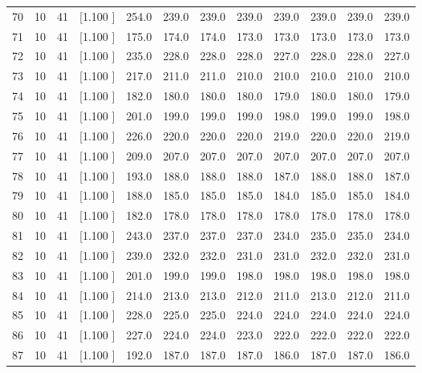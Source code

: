 \documentclass[12pt,a4paper]{article}
\begin{document}
\begin{center}
{\begin{tabular}{r r r r r r r r r r r r}
  70& 10& 41&[1.100     ]&   254.0&   239.0&   239.0&   239.0&   239.0&   239.0&   239.0&   239.0\\[-0.02in]
  71& 10& 41&[1.100     ]&   175.0&   174.0&   174.0&   173.0&   173.0&   173.0&   173.0&   173.0\\[-0.02in]
  72& 10& 41&[1.100     ]&   235.0&   228.0&   228.0&   228.0&   227.0&   228.0&   228.0&   227.0\\[-0.02in]
  73& 10& 41&[1.100     ]&   217.0&   211.0&   211.0&   210.0&   210.0&   210.0&   210.0&   210.0\\[-0.02in]
  74& 10& 41&[1.100     ]&   182.0&   180.0&   180.0&   180.0&   179.0&   180.0&   180.0&   179.0\\[-0.02in]
  75& 10& 41&[1.100     ]&   201.0&   199.0&   199.0&   199.0&   198.0&   199.0&   199.0&   198.0\\[-0.02in]
  76& 10& 41&[1.100     ]&   226.0&   220.0&   220.0&   220.0&   219.0&   220.0&   220.0&   219.0\\[-0.02in]
  77& 10& 41&[1.100     ]&   209.0&   207.0&   207.0&   207.0&   207.0&   207.0&   207.0&   207.0\\[-0.02in]
  78& 10& 41&[1.100     ]&   193.0&   188.0&   188.0&   188.0&   187.0&   188.0&   188.0&   187.0\\[-0.02in]
  79& 10& 41&[1.100     ]&   188.0&   185.0&   185.0&   185.0&   184.0&   185.0&   185.0&   184.0\\[-0.02in]
  80& 10& 41&[1.100     ]&   182.0&   178.0&   178.0&   178.0&   178.0&   178.0&   178.0&   178.0\\[-0.02in]
  81& 10& 41&[1.100     ]&   243.0&   237.0&   237.0&   237.0&   234.0&   235.0&   235.0&   234.0\\[-0.02in]
  82& 10& 41&[1.100     ]&   239.0&   232.0&   232.0&   231.0&   231.0&   232.0&   232.0&   231.0\\[-0.02in]
  83& 10& 41&[1.100     ]&   201.0&   199.0&   199.0&   198.0&   198.0&   198.0&   198.0&   198.0\\[-0.02in]
  84& 10& 41&[1.100     ]&   214.0&   213.0&   213.0&   212.0&   211.0&   213.0&   212.0&   211.0\\[-0.02in]
  85& 10& 41&[1.100     ]&   228.0&   225.0&   225.0&   224.0&   224.0&   224.0&   224.0&   224.0\\[-0.02in]
  86& 10& 41&[1.100     ]&   227.0&   224.0&   224.0&   223.0&   222.0&   222.0&   222.0&   222.0\\[-0.02in]
  87& 10& 41&[1.100     ]&   192.0&   187.0&   187.0&   187.0&   186.0&   187.0&   187.0&   186.0\\[-0.02in]

\end{tabular}}
\end{center}
\end{document}
